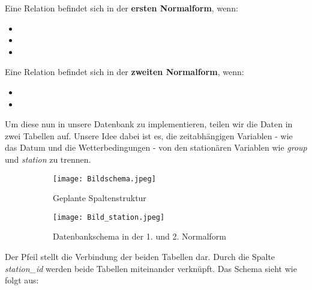 \documentclass[a4paper, 12pt]{article}
\begin{document}
\vspace{\baselineskip} 

Eine Relation befindet sich in der \textbf{ersten Normalform}, wenn:

\begin{itemize}
   \item {}
   \item {}
   \item {}
\end{itemize}

\vspace{\baselineskip} 

Eine Relation befindet sich in der \textbf{zweiten Normalform}, wenn:

\begin{itemize}[rightmargin=0pt]
    \item {}
    \item {}
\end{itemize}

\vspace{\baselineskip} 

Um diese nun in unsere Datenbank zu implementieren, teilen wir die Daten in zwei Tabellen auf. Unsere Idee dabei ist es, die zeitabhängigen Variablen - wie das Datum und die Wetterbedingungen - von den stationären Variablen wie \textit{group} und \textit{station} zu trennen.

\begin{figure}[ht]
    \centering
     \begin{subfigure}{0.25\textwidth}
        \centering
        \texttt{[image: Bildschema.jpeg]}
        \par Geplante Spaltenstruktur 
    \end{subfigure}
    \hfill
     \begin{subfigure}{0.72\textwidth}
        \centering
        \texttt{[image: Bild\_station.jpeg]}
        \par Datenbankschema in der 1. und 2. Normalform
    \end{subfigure}
\end{figure}

\newpage
Der Pfeil stellt die Verbindung der beiden Tabellen dar. Durch die Spalte \textit{station\_id} werden beide Tabellen miteinander verknüpft. Das Schema sieht wie folgt aus: 
\end{document}
